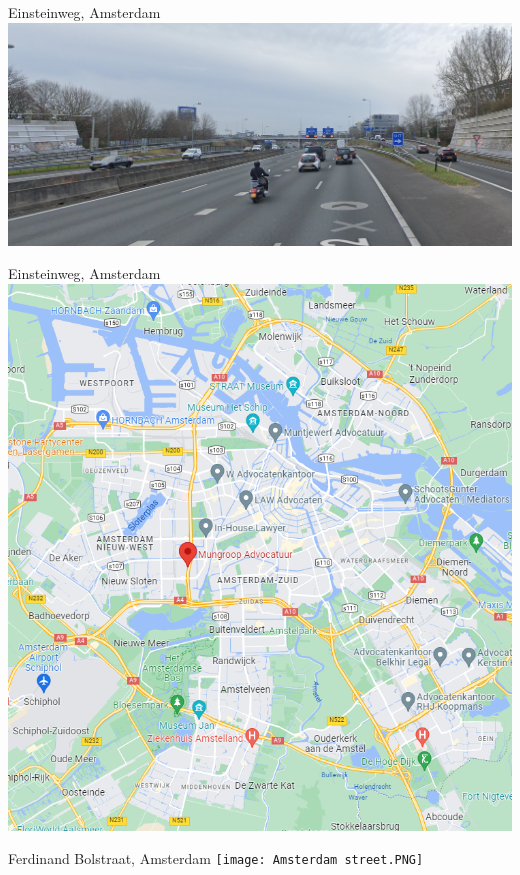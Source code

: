 \documentclass{beamer}
\begin{document}
    \begin{frame}{Einsteinweg, Amsterdam}
        \includegraphics[width = \textwidth]{Amsterdam road.PNG}
    \end{frame}

    \begin{frame}{Einsteinweg, Amsterdam}
        \includegraphics[width = 0.8\textheight]{Amsterdam road map.PNG}
    \end{frame}

    \begin{frame}{Ferdinand Bolstraat, Amsterdam}
        \texttt{[image: Amsterdam street.PNG]}
    \end{frame}
\end{document}
